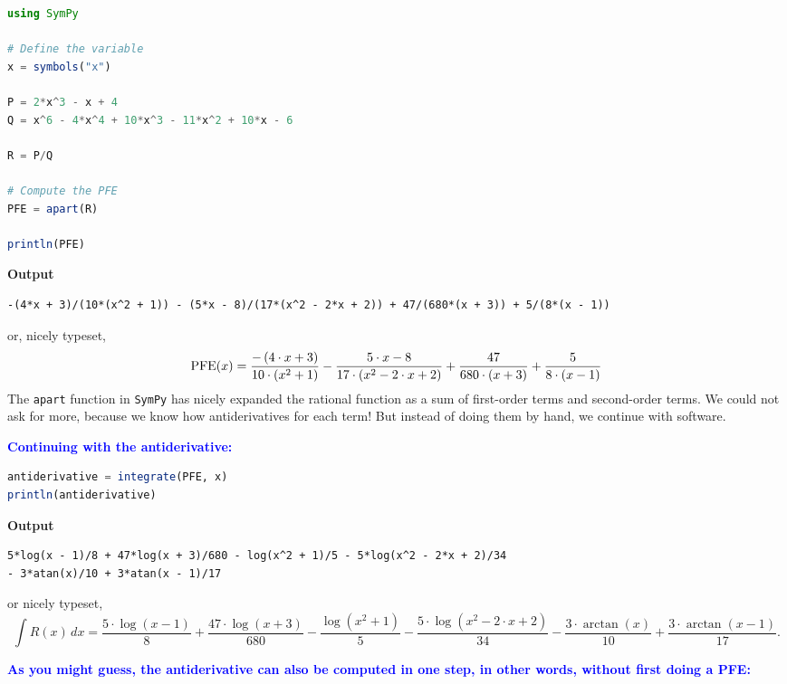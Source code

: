 \begin{lstlisting}[language=Julia,style=mystyle]
using SymPy

# Define the variable
x = symbols("x")

P = 2*x^3 - x + 4
Q = x^6 - 4*x^4 + 10*x^3 - 11*x^2 + 10*x - 6

R = P/Q

# Compute the PFE
PFE = apart(R)

println(PFE)
\end{lstlisting}
\textbf{Output} 
\begin{verbatim}
-(4*x + 3)/(10*(x^2 + 1)) - (5*x - 8)/(17*(x^2 - 2*x + 2)) + 47/(680*(x + 3)) + 5/(8*(x - 1))
\end{verbatim}
or, nicely typeset,
$${\rm PFE}(x) =  \frac{ - \left( 4 \cdot x + 3 \right)}{10 \cdot \left( x^{2} + 1 \right)} - \frac{5 \cdot x - 8}{17 \cdot \left( x^{2} - 2 \cdot x + 2 \right)} + \frac{47}{680 \cdot \left( x + 3 \right)} + \frac{5}{8 \cdot \left( x - 1 \right)}$$
The \texttt{apart} function in \texttt{SymPy} has nicely expanded the rational function as a sum of first-order terms and second-order terms. We could not ask for more, because we know how antiderivatives for each term! But instead of doing them by hand, we continue with software.

\bigskip
\textcolor{blue}{\bf \Large Continuing with the antiderivative:}\\


\begin{lstlisting}[language=Julia,style=mystyle]
antiderivative = integrate(PFE, x)
println(antiderivative)
\end{lstlisting}
\textbf{Output} 
\begin{verbatim}
5*log(x - 1)/8 + 47*log(x + 3)/680 - log(x^2 + 1)/5 - 5*log(x^2 - 2*x + 2)/34 
- 3*atan(x)/10 + 3*atan(x - 1)/17
\end{verbatim}
or nicely typeset,
$$\int R(x)\, dx =\frac{5 \cdot \log\left( x - 1 \right)}{8} + \frac{47 \cdot \log\left( x + 3 \right)}{680} - \frac{\log\left( x^{2} + 1 \right)}{5} - \frac{5 \cdot \log\left( x^{2} - 2 \cdot x + 2 \right)}{34} - \frac{3 \cdot \arctan\left( x \right)}{10} + \frac{3 \cdot \arctan\left( x - 1 \right)}{17}. $$

\bigskip
\textcolor{blue}{\bf \Large As you might guess, the antiderivative can also be computed in one step, in other words, without first doing a PFE:}\\

